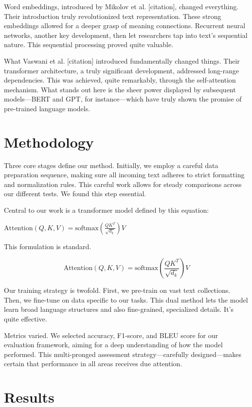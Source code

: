 \documentclass{article}
\begin{document}
Word embeddings, introduced by Mikolov et al. [citation], changed everything. Their introduction truly revolutionized text representation. These strong embeddings allowed for a deeper grasp of meaning connections. Recurrent neural networks, another key development, then let researchers tap into text's sequential nature. This sequential processing proved quite valuable.

What Vaswani et al. [citation] introduced fundamentally changed things. Their transformer architecture, a truly significant development, addressed long-range dependencies. This was achieved, quite remarkably, through the self-attention mechanism. What stands out here is the sheer power displayed by subsequent models—BERT and GPT, for instance—which have truly shown the promise of pre-trained language models.

\section{Methodology}

Three core stages define our method. Initially, we employ a careful data preparation sequence, making sure all incoming text adheres to strict formatting and normalization rules. This careful work allows for steady comparisons across our different tests. We found this step essential.

Central to our work is a transformer model defined by this equation:

$\text{Attention}(Q, K, V) = \text{softmax}\left(\frac{QK^T}{\sqrt{d_k}}\right)V$

This formulation is standard.

\begin{equation}
\text{Attention}(Q, K, V) = \text{softmax}\left(\frac{QK^T}{\sqrt{d_k}}\right)V
\end{equation}

Our training strategy is twofold. First, we pre-train on vast text collections. Then, we fine-tune on data specific to our tasks. This dual method lets the model learn broad language structures and also fine-grained, specialized details. It’s quite effective.

Metrics varied. We selected accuracy, F1-score, and BLEU score for our evaluation framework, aiming for a deep understanding of how the model performed. This multi-pronged assessment strategy—carefully designed—makes certain that performance in all areas receives due attention.

\section{Results}
\end{document}
